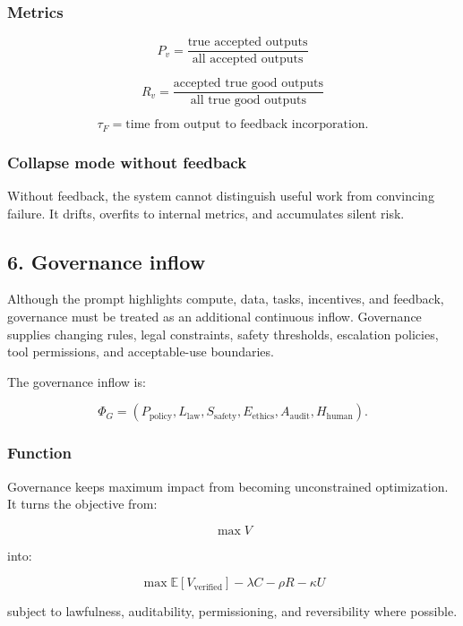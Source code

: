 \documentclass[
  11pt,
]{article}
\begin{document}
\subsubsection{Metrics}\label{metrics-4}

\[
P_v=\frac{\text{true accepted outputs}}{\text{all accepted outputs}}
\]

\[
R_v=\frac{\text{accepted true good outputs}}{\text{all true good outputs}}
\]

\[
\tau_F=\text{time from output to feedback incorporation}.
\]

\subsubsection{Collapse mode without
feedback}\label{collapse-mode-without-feedback}

Without feedback, the system cannot distinguish useful work from
convincing failure. It drifts, overfits to internal metrics, and
accumulates silent risk.

\subsection{6. Governance inflow}\label{governance-inflow}

Although the prompt highlights compute, data, tasks, incentives, and
feedback, governance must be treated as an additional continuous inflow.
Governance supplies changing rules, legal constraints, safety
thresholds, escalation policies, tool permissions, and acceptable-use
boundaries.

The governance inflow is:

\[
\Phi_G=(P_{\text{policy}},L_{\text{law}},S_{\text{safety}},E_{\text{ethics}},A_{\text{audit}},H_{\text{human}}).
\]

\subsubsection{Function}\label{function-5}

Governance keeps maximum impact from becoming unconstrained
optimization. It turns the objective from:

\[
\max V
\]

into:

\[
\max \mathbb{E}[V_{\text{verified}}]-\lambda C-\rho R-\kappa U
\]

subject to lawfulness, auditability, permissioning, and reversibility
where possible.
\end{document}
